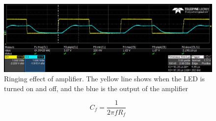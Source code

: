 \begin{figure}[h]
\includegraphics[width=\linewidth]{img/ringing_test_filtered_rise.jpg}
\caption{Ringing effect of amplifier. The yellow line shows when the LED is turned on and off, and the blue is the output of the amplifier}
\label{fig::scope_op_amp_with_C}
\end{figure}


\begin{equation}
 C_f = \frac{1}{2 \pi f R_f} \label{eq:capacitance_approximate}
\end{equation}


